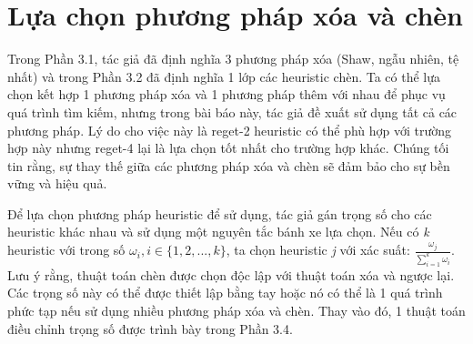 \section{Lựa chọn phương pháp xóa và chèn}
Trong Phần 3.1, tác giả đã định nghĩa 3 phương pháp xóa (Shaw, ngẫu nhiên, tệ nhất) và trong Phần 3.2 đã định nghĩa 1 lớp các heuristic chèn. Ta có thể lựa chọn kết hợp 1 phương pháp xóa và 1 phương pháp thêm với nhau để phục vụ quá trình tìm kiếm, nhưng trong bài báo này, tác giả đề xuất sử dụng tất cả các phương pháp. Lý do cho việc này là reget-2 heuristic có thể phù hợp với trường hợp này nhưng reget-4 lại là lựa chọn tốt nhất cho trường hợp khác. Chúng tối tin rằng, sự thay thế giữa các phương pháp xóa và chèn sẽ đảm bảo cho sự bền vững và hiệu quả.

Để lựa chọn phương pháp heuristic để sử dụng, tác giả gán trọng số cho các heuristic khác nhau và sử dụng một nguyên tắc bánh xe lựa chọn. Nếu có \textit{k} heuristic với trong số $\omega_i, i \in \{1,2,...,k\}$, ta chọn heuristic \textit{j} với xác suất: $\frac{\omega_j}{\sum_{i=1}^k \omega_i}$. Lưu ý rằng, thuật toán chèn được chọn độc lập với thuật toán xóa và ngược lại. Các trọng số này có thể được thiết lập bằng tay hoặc nó có thể là 1 quá trình phức tạp nếu sử dụng nhiều phương pháp xóa và chèn. Thay vào đó, 1 thuật toán điều chỉnh trọng số được trình bày trong Phần 3.4.

